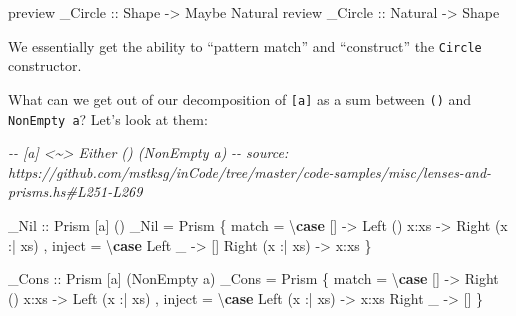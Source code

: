 \documentclass[]{article}
\newenvironment{Shaded}{}{}
\newcommand{\CommentTok}[1]{\textcolor[rgb]{0.38,0.63,0.69}{\textit{#1}}}
\newcommand{\DataTypeTok}[1]{\textcolor[rgb]{0.56,0.13,0.00}{#1}}
\newcommand{\KeywordTok}[1]{\textcolor[rgb]{0.00,0.44,0.13}{\textbf{#1}}}
\newcommand{\NormalTok}[1]{#1}
\newcommand{\OperatorTok}[1]{\textcolor[rgb]{0.40,0.40,0.40}{#1}}
\newcommand{\OtherTok}[1]{\textcolor[rgb]{0.00,0.44,0.13}{#1}}
\begin{document}
\begin{Shaded}
\begin{Highlighting}[]
\NormalTok{preview}\OtherTok{ \_Circle ::} \DataTypeTok{Shape}   \OtherTok{{-}>} \DataTypeTok{Maybe} \DataTypeTok{Natural}
\NormalTok{review}\OtherTok{  \_Circle ::} \DataTypeTok{Natural} \OtherTok{{-}>} \DataTypeTok{Shape}
\end{Highlighting}
\end{Shaded}

We essentially get the ability to ``pattern match'' and ``construct'' the
\texttt{Circle} constructor.

What can we get out of our decomposition of \texttt{{[}a{]}} as a sum between
\texttt{()} and \texttt{NonEmpty\ a}? Let's look at them:

\begin{Shaded}
\begin{Highlighting}[]
\CommentTok{{-}{-} [a] <\textasciitilde{}> Either () (NonEmpty a)}
\CommentTok{{-}{-} source: https://github.com/mstksg/inCode/tree/master/code{-}samples/misc/lenses{-}and{-}prisms.hs\#L251{-}L269}

\OtherTok{\_Nil ::} \DataTypeTok{Prism\textquotesingle{}}\NormalTok{ [a] ()}
\NormalTok{\_Nil }\OtherTok{=} \DataTypeTok{Prism\textquotesingle{}}
\NormalTok{    \{ match  }\OtherTok{=}\NormalTok{ \textbackslash{}}\KeywordTok{case}
\NormalTok{        []              }\OtherTok{{-}>} \DataTypeTok{Left}\NormalTok{ ()}
\NormalTok{        x}\OperatorTok{:}\NormalTok{xs            }\OtherTok{{-}>} \DataTypeTok{Right}\NormalTok{ (x }\OperatorTok{:|}\NormalTok{ xs)}
\NormalTok{    , inject }\OtherTok{=}\NormalTok{ \textbackslash{}}\KeywordTok{case}
        \DataTypeTok{Left}\NormalTok{ \_          }\OtherTok{{-}>}\NormalTok{ []}
        \DataTypeTok{Right}\NormalTok{ (x }\OperatorTok{:|}\NormalTok{ xs) }\OtherTok{{-}>}\NormalTok{ x}\OperatorTok{:}\NormalTok{xs}
\NormalTok{    \}}

\OtherTok{\_Cons ::} \DataTypeTok{Prism\textquotesingle{}}\NormalTok{ [a] (}\DataTypeTok{NonEmpty}\NormalTok{ a)}
\NormalTok{\_Cons }\OtherTok{=} \DataTypeTok{Prism\textquotesingle{}}
\NormalTok{    \{ match  }\OtherTok{=}\NormalTok{ \textbackslash{}}\KeywordTok{case}
\NormalTok{        []              }\OtherTok{{-}>} \DataTypeTok{Right}\NormalTok{ ()}
\NormalTok{        x}\OperatorTok{:}\NormalTok{xs            }\OtherTok{{-}>} \DataTypeTok{Left}\NormalTok{ (x }\OperatorTok{:|}\NormalTok{ xs)}
\NormalTok{    , inject }\OtherTok{=}\NormalTok{ \textbackslash{}}\KeywordTok{case}
        \DataTypeTok{Left}\NormalTok{  (x }\OperatorTok{:|}\NormalTok{ xs) }\OtherTok{{-}>}\NormalTok{ x}\OperatorTok{:}\NormalTok{xs}
        \DataTypeTok{Right}\NormalTok{ \_         }\OtherTok{{-}>}\NormalTok{ []}
\NormalTok{    \}}
\end{Highlighting}
\end{Shaded}
\end{document}
